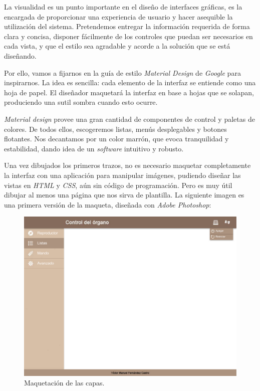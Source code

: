 La visualidad es un punto importante en el diseño de interfaces gráficas, es la encargada de proporcionar una experiencia de usuario y hacer asequible la utilización del sistema. Pretendemos entregar la información requerida de forma clara y concisa, disponer fácilmente de los controles que puedan ser necesarios en cada vista, y que el estilo sea agradable y acorde a la solución que se está diseñando.

Por ello, vamos a fijarnos en la guía de estilo \textit{Material Design} de \textit{Google} para inspirarnos. La idea es sencilla: cada elemento de la interfaz se entiende como una hoja de papel. El diseñador maquetará la interfaz en base a hojas que se solapan, produciendo una sutil sombra cuando esto ocurre.

\textit{Material design} provee una gran cantidad de componentes de control y paletas de colores. De todos ellos, escogeremos listas, menús desplegables y botones flotantes. Nos decantamos por un color marrón, que evoca tranquilidad y estabilidad, dando idea de un \textit{software} intuitivo y robusto.

Una vez dibujados los primeros trazos, no es necesario maquetar completamente la interfaz con una aplicación para manipular imágenes, pudiendo diseñar las vistas en \textit{HTML} y \textit{CSS}, aún sin código de programación. Pero es muy útil dibujar al menos una página que nos sirva de plantilla. La siguiente imagen es una primera versión de la maqueta, diseñada con \textit{Adobe Photoshop}:

\smallskip

\begin{figure}[H]
	\noindent \begin{centering}
		\includegraphics[width=\linewidth*3/4]{capitulo4/maqueta}
		\par\end{centering}
	\smallskip
	\caption{\label{fig:maqueta} Maquetación de las capas.}
\end{figure}

